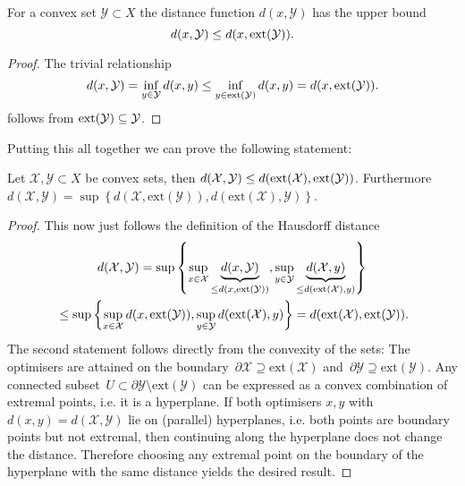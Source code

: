 %
\begin{thm}
For a convex set $\mathcal Y\subset X$ the distance function $d(x,\mathcal Y)$ has the upper bound
%
\begin{equation}
	d(x,\mathcal Y)\leq d(x,\text{ext}(\mathcal Y)).
\end{equation}
\end{thm}
%
\begin{proof}
%
The trivial relationship
%
\begin{equation}
	d(x,\mathcal Y) = \inf_{y\in\mathcal Y} d(x,y) \leq \inf_{y\in\text{ext}(\mathcal Y)} d(x,y) = d(x,\text{ext}(\mathcal Y)).
\end{equation}
%
follows from $\text{ext}(\mathcal Y)\subseteq \mathcal Y$.
\end{proof}
%
\noindent Putting this all together we can prove the following statement:
%
\begin{thm}\label{thm:Hausdorff:convex:sets:extremal:points}
Let $\mathcal X,\mathcal Y\subset X$ be convex sets, then $d(\mathcal X,\mathcal Y)\leq d(\text{ext}(\mathcal X),\text{ext}(\mathcal Y))$.
%
Furthermore $d(\mathcal X,\mathcal Y) = \sup\left\{d(\mathcal X,\text{ext}(\mathcal Y)),d(\text{ext}(\mathcal X),\mathcal Y)\right\}$.
\end{thm}
%
\begin{proof}
This now just follows the definition of the Hausdorff distance
%
\begin{multline}
	d(\mathcal X,\mathcal Y) = \sup\left\{\sup_{x\in\mathcal X} \underbrace{d(x,\mathcal Y)}_{\leq d(x,\ext(\mathcal Y))}, \sup_{y\in\mathcal Y} \underbrace{d(\mathcal X,y)}_{\leq d(\ext(\mathcal X),y)} \right\}\\ \leq 
	\sup\left\{\sup_{x\in\mathcal X} d(x,\ext(\mathcal Y)), \sup_{y\in\mathcal Y}  d(\ext(\mathcal X),y) \right\} = d(\ext(\mathcal X),\ext(\mathcal Y)).
\end{multline}
%
The second statement follows directly from the convexity of the sets: The optimisers are attained on the boundary~$\partial \mathcal X\supseteq\text{ext}(\mathcal X)$ and~$\partial\mathcal Y\supseteq\text{ext}(\mathcal Y)$.
%
Any connected subset~$U \subset \partial\mathcal Y\setminus\text{ext}(\mathcal Y)$ can be expressed as a convex combination of extremal points, i.e. it is a hyperplane. 
%
If both optimisers $x,y$ with $d(x,y) = d(\mathcal X,\mathcal Y)$ lie on (parallel) hyperplanes, i.e. both points are boundary points but not extremal, then continuing along the hyperplane does not change the distance.
%
Therefore choosing any extremal point on the boundary of the hyperplane with the same distance yields the desired result.
%
\end{proof}

